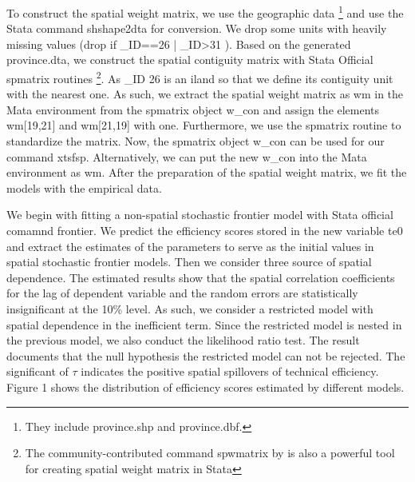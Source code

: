  \begin{stlog}
	
\end{stlog}

To construct the spatial weight matrix,  we use the geographic data \footnote{They include province.shp and province.dbf.} and use the Stata command shshape2dta for conversion. We drop some units with heavily missing values (drop  if \_ID==26 | \_ID>31 ).  Based on the generated province.dta, we construct the spatial contiguity matrix with Stata Official spmatrix routines \footnote{The community-contributed command spwmatrix by \citep{Wilner2010} is also a powerful tool for creating spatial weight matrix in Stata}. As \_ID 26 is an iland so that we define its contiguity unit with the nearest one. As such, we extract the spatial weight matrix as wm in the Mata environment from the spmatrix object w\_con and assign the elements wm[19,21] and wm[21,19] with one.  Furthermore, we use the spmatrix routine to standardize the matrix.  Now, the spmatrix object w\_con can be used for our command xtsfsp. Alternatively, we can put the new w\_con into the Mata environment as wm.  After the preparation of the spatial weight matrix, we fit the models with the  empirical data. 

We begin with fitting a non-spatial stochastic frontier model with Stata official comamnd frontier. We predict the efficiency scores stored in the new variable te0  and extract the estimates of the parameters to serve as the initial values in spatial stochastic frontier models.  Then we consider three source of spatial dependence. The estimated results show that the spatial correlation coefficients for the lag of dependent variable and the random errors are statistically insignificant at the 10\% level. As such, we consider a restricted model with spatial dependence in the inefficient term.  Since the restricted model is nested in the previous model, we also conduct the likelihood ratio test. The result documents that the null hypothesis the restricted model can not be rejected. The significant of $\tau$  indicates the positive spatial spillovers of technical efficiency. Figure 1 shows the distribution of efficiency scores estimated by different models. 

